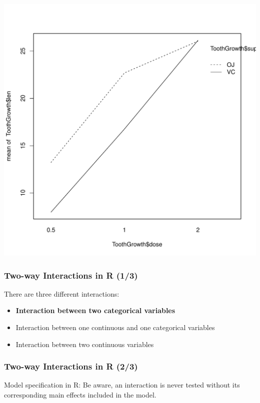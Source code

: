 \documentclass{beamer}\usepackage[]{graphicx}\usepackage[]{color}
\newenvironment{knitrout}{}{} %
\begin{document}
{{{\begin{frame}[fragile]
\begin{knitrout}
{\centering \includegraphics[width=0.7\linewidth]{figure/unnamed-chunk-64-1} 

}



\end{knitrout}
\end{frame}


\begin{frame}[fragile]
\frametitle{Two-way Interactions in R (1/3)}
\vspace*{0.3cm}
There are three different interactions:
\begin{itemize}
\item \textbf{Interaction between two categorical variables}
\item Interaction between one continuous and one categorical variables
\item Interaction between two continuous variables
\end{itemize}
\end{frame}


\begin{frame}[fragile]
\frametitle{Two-way Interactions in R (2/3)}
Model specification in R: Be aware, an interaction is never tested without its
corresponding main effects included in the model.



\end{frame}}}}
\end{document}
